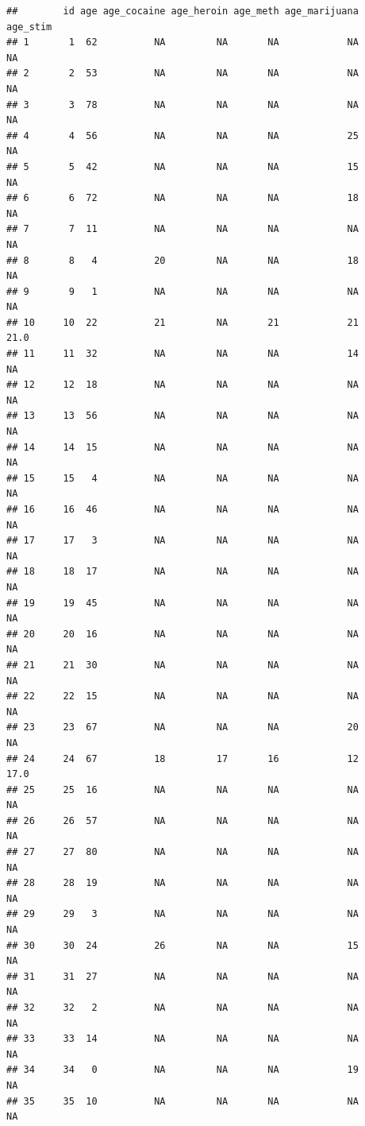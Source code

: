 \documentclass[man]{apa6}
\begin{document}
\begin{verbatim}
##        id age age_cocaine age_heroin age_meth age_marijuana age_stim
## 1       1  62          NA         NA       NA            NA       NA
## 2       2  53          NA         NA       NA            NA       NA
## 3       3  78          NA         NA       NA            NA       NA
## 4       4  56          NA         NA       NA            25       NA
## 5       5  42          NA         NA       NA            15       NA
## 6       6  72          NA         NA       NA            18       NA
## 7       7  11          NA         NA       NA            NA       NA
## 8       8   4          20         NA       NA            18       NA
## 9       9   1          NA         NA       NA            NA       NA
## 10     10  22          21         NA       21            21     21.0
## 11     11  32          NA         NA       NA            14       NA
## 12     12  18          NA         NA       NA            NA       NA
## 13     13  56          NA         NA       NA            NA       NA
## 14     14  15          NA         NA       NA            NA       NA
## 15     15   4          NA         NA       NA            NA       NA
## 16     16  46          NA         NA       NA            NA       NA
## 17     17   3          NA         NA       NA            NA       NA
## 18     18  17          NA         NA       NA            NA       NA
## 19     19  45          NA         NA       NA            NA       NA
## 20     20  16          NA         NA       NA            NA       NA
## 21     21  30          NA         NA       NA            NA       NA
## 22     22  15          NA         NA       NA            NA       NA
## 23     23  67          NA         NA       NA            20       NA
## 24     24  67          18         17       16            12     17.0
## 25     25  16          NA         NA       NA            NA       NA
## 26     26  57          NA         NA       NA            NA       NA
## 27     27  80          NA         NA       NA            NA       NA
## 28     28  19          NA         NA       NA            NA       NA
## 29     29   3          NA         NA       NA            NA       NA
## 30     30  24          26         NA       NA            15       NA
## 31     31  27          NA         NA       NA            NA       NA
## 32     32   2          NA         NA       NA            NA       NA
## 33     33  14          NA         NA       NA            NA       NA
## 34     34   0          NA         NA       NA            19       NA
## 35     35  10          NA         NA       NA            NA       NA

\end{verbatim}
\end{document}
